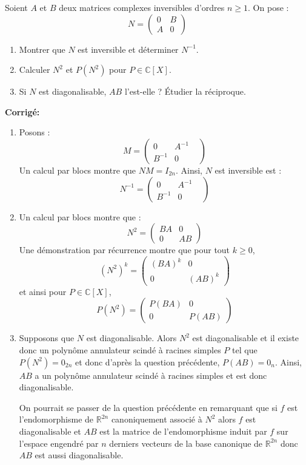 \documentclass[a4paper,twoside,french,10pt]{VcCours}
\newcommand{\corr}{\textbf{Corrigé:}}
\begin{document}
\begin{Exercice}{} Soient $A$ et $B$ deux matrices complexes inversibles d'ordres $n \geq 1$. On pose :
$$ N = \begin{pmatrix}
0 & B \\
A & 0
\end{pmatrix}$$
\begin{enumerate}
\item Montrer que $N$ est inversible et déterminer $N^{-1}$.
\item Calculer $N^2$ et $P(N^2)$ pour $P \in \mathbb{C}[X]$.
\item Si $N$ est diagonalisable, $AB$ l'est-elle ? Étudier la réciproque.
\end{enumerate}
\end{Exercice}

\corr \begin{enumerate}
\item Posons :
$$ M = \begin{pmatrix}
0 & A^{-1} \\
B^{-1} & 0& 
\end{pmatrix}$$
Un calcul par blocs montre que $NM=I_{2n}$. Ainsi, $N$ est inversible est :
$$ N^{-1} = \begin{pmatrix}
0 & A^{-1} \\
B^{-1} & 0& 
\end{pmatrix}$$
\item Un calcul par blocs montre que :
$$ N^{2} = \begin{pmatrix}
BA & 0 \\
0 & AB
\end{pmatrix}$$
Une démonstration par récurrence montre que pour tout $k \geq 0$,
$$ (N^2)^k =  \begin{pmatrix}
(BA)^k & 0 \\
0 & (AB)^k
\end{pmatrix}$$
et ainsi pour $P \in \mathbb{C}[X]$, 
$$ P(N^2) = \begin{pmatrix}
P(BA) & 0 \\
0 & P(AB) 
\end{pmatrix}$$
\item Supposons que $N$ est diagonalisable. Alors $N^2$ est diagonalisable et il existe donc un polynôme annulateur scindé à racines simples $P$ tel que $P(N^2)=0_{2n}$ et donc d'après la question précédente, $P(AB)=0_n$. Ainsi, $AB$ a un polynôme annulateur scindé à racines simples et est donc diagonalisable.


On pourrait se passer de la question précédente en remarquant que si $f$ est l'endomorphisme de $\mathbb{R}^{2n}$ canoniquement associé à $N^2$ alors $f$ est diagonalisable et $AB$ est la matrice de l'endomorphisme induit par $f$ sur l'espace engendré par $n$ derniers vecteurs de la base canonique de $\mathbb{R}^{2n}$ donc $AB$ est aussi diagonalisable.



\end{enumerate}
\end{document}
